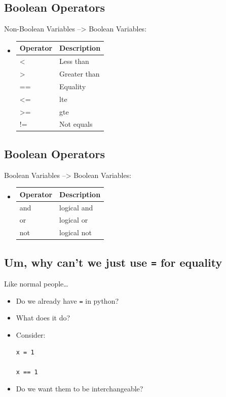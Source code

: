 \documentclass[11pt]{article}
\begin{document}
\subsection{Boolean Operators}
\label{sec:orgb7746d2}
Non-Boolean Variables --> Boolean Variables:
\begin{itemize}
\item \begin{center}
\begin{tabular}{ll}
Operator & Description\\
\hline
< & Less than\\
> & Greater than\\
== & Equality\\
<= & lte\\
>= & gte\\
!= & Not equals\\
\end{tabular}
\end{center}
\end{itemize}

\subsection{Boolean Operators}
\label{sec:orge2fee6b}
Boolean Variables --> Boolean Variables:
\begin{itemize}
\item \begin{center}
\begin{tabular}{ll}
Operator & Description\\
\hline
and & logical and\\
or & logical or\\
not & logical not\\
\end{tabular}
\end{center}
\end{itemize}
\subsection{Um, why can't we just use \texttt{=} for equality}
\label{sec:orga2210ff}
Like normal people\ldots{}
\begin{itemize}
\item Do we already have \texttt{=} in python?
\item What does it do?
\item Consider:
\begin{verbatim}
x = 1

x == 1
\end{verbatim}
\item Do we want them to be interchangeable?
\end{itemize}
\end{document}
